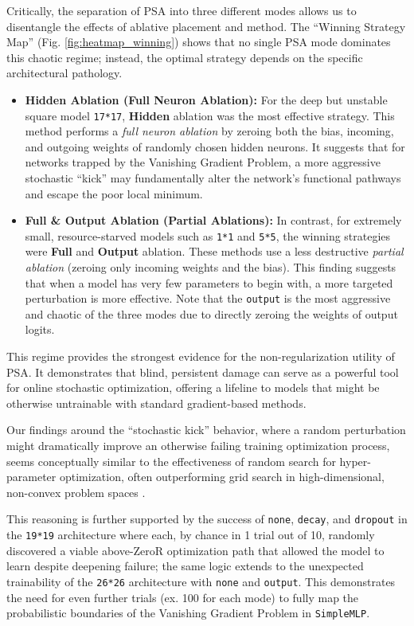 \documentclass[conference]{IEEEtran}
\begin{document}
Critically, the separation of PSA into three different modes allows us to disentangle the effects of ablative placement and method. The ``Winning Strategy Map'' (Fig. \ref{fig:heatmap_winning}) shows that no single PSA mode dominates this chaotic regime; instead, the optimal strategy depends on the specific architectural pathology.

\begin{itemize}
    \item \textbf{Hidden Ablation (Full Neuron Ablation):} For the deep but unstable square model \texttt{17*17}, \textbf{Hidden} ablation was the most effective strategy. This method performs a \textit{full neuron ablation} by zeroing both the bias, incoming, and outgoing weights of randomly chosen hidden neurons. It suggests that for networks trapped by the Vanishing Gradient Problem, a more aggressive stochastic ``kick'' may fundamentally alter the network's functional pathways and escape the poor local minimum.

    \item \textbf{Full \& Output Ablation (Partial Ablations):} In contrast, for extremely small, resource-starved models such as \texttt{1*1} and \texttt{5*5}, the winning strategies were \textbf{Full} and \textbf{Output} ablation. These methods use a less destructive \textit{partial ablation} (zeroing only incoming weights and the bias). This finding suggests that when a model has very few parameters to begin with, a more targeted perturbation is more effective. Note that the \verb|output| is the most aggressive and chaotic of the three modes due to directly zeroing the weights of output logits.
\end{itemize}

This regime provides the strongest evidence for the non-regularization utility of PSA. It demonstrates that blind, persistent damage can serve as a powerful tool for online stochastic optimization, offering a lifeline to models that might be otherwise untrainable with standard gradient-based methods.

Our findings around the ``stochastic kick'' behavior, where a random perturbation might dramatically improve an otherwise failing training optimization process, seems conceptually similar to the effectiveness of random search for hyper-parameter optimization, often outperforming grid search in high-dimensional, non-convex problem spaces \cite{b7}.

This reasoning is further supported by the success of \verb|none|, \verb|decay|, and \verb|dropout| in the \verb|19*19| architecture where each, by chance in 1 trial out of 10, randomly discovered a viable above-ZeroR optimization path that allowed the model to learn despite deepening failure; the same logic extends to the unexpected trainability of the \verb|26*26| architecture with \verb|none| and \verb|output|. This demonstrates the need for even further trials (ex. 100 for each mode) to fully map the probabilistic boundaries of the Vanishing Gradient Problem in \verb|SimpleMLP|.
\end{document}
